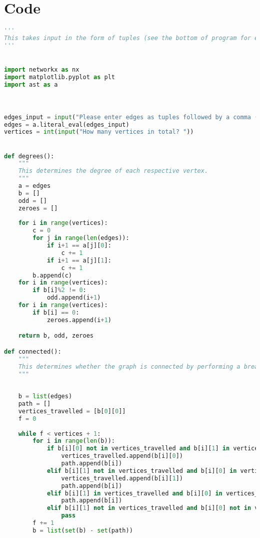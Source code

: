 \documentclass{article}
\begin{document}
\section{Code}


\begin{lstlisting}[language=Python]
'''
This takes input in the form of tuples (see the bottom of program for example) representing edges of a graph and determines whether they form either an Eulerian trail/tour. If they do it returns the edges in the respective order.
'''


import networkx as nx
import matplotlib.pyplot as plt
import ast as a



edges_input = input("Please enter edges as tuples followed by a comma (e.x, (1,2), (2,3), ... ): ")
edges = a.literal_eval(edges_input)
vertices = int(input("How many vertices in total? "))


def degrees():
    """
    This determines the degree of each respective vertex.
    """
    a = edges
    b = []
    odd = []
    zeroes = []
    
    for i in range(vertices):
        c = 0
        for j in range(len(edges)):
            if i+1 == a[j][0]: 
                c += 1
            if i+1 == a[j][1]:
                c += 1
        b.append(c)
    for i in range(vertices):
        if b[i]%2 != 0:
            odd.append(i+1)
    for i in range(vertices):
        if b[i] == 0:
            zeroes.append(i+1)

    return b, odd, zeroes

def connected():
    """
    This determines whether the graph is connected by performing a breadth first search.
    """
    
    
    b = list(edges)
    path = []
    vertices_travelled = [b[0][0]]
    f = 0
    
    while f < vertices + 1:    
        for i in range(len(b)):
            if b[i][0] not in vertices_travelled and b[i][1] in vertices_travelled:
                vertices_travelled.append(b[i][0])
                path.append(b[i])
            elif b[i][1] not in vertices_travelled and b[i][0] in vertices_travelled:
                vertices_travelled.append(b[i][1])
                path.append(b[i])
            elif b[i][1] in vertices_travelled and b[i][0] in vertices_travelled:
                path.append(b[i])
            elif b[i][1] not in vertices_travelled and b[i][0] not in vertices_travelled:
                pass
        f += 1
        b = list(set(b) - set(path))
            

\end{lstlisting}
\end{document}
